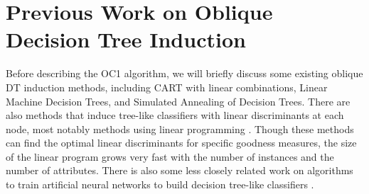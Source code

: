 \section{Previous Work on Oblique Decision Tree Induction}
\label{section:oblique}

Before describing the OC1 algorithm, we will briefly discuss some
existing oblique DT induction methods, including CART with linear
combinations, Linear Machine Decision Trees, and Simulated Annealing
of Decision Trees.  There are also methods that induce tree-like
classifiers with linear discriminants at each node, most notably
methods using linear programming 
\cite{mangasarian/etal/90,bennett/mangasarian/92,%
bennett/mangasarian/94a,bennett/mangasarian/94b}.  Though these
methods can find the optimal linear discriminants for specific
goodness measures, the size of the linear program grows very fast with
the number of instances and the number of attributes.  There is also
some less closely related work on algorithms to train artificial
neural networks to build decision tree-like classifiers
\cite{brent/91,cios/liu/92,herman/yeung/92}.

